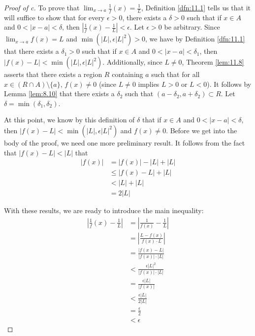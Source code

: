 \documentclass[../main.tex]{subfiles}
\begin{document}
\begin{theorem}
\begin{proof}[Proof of c]
        To prove that $\lim_{x\to a}\frac{1}{f}(x)=\frac{1}{L}$, Definition \ref{dfn:11.1} tells us that it will suffice  to show that for every $\epsilon>0$, there exists a $\delta>0$ such that if $x\in A$ and $0<|x-a|<\delta$, then $|\frac{1}{f}(x)-\frac{1}{L}|<\epsilon$. Let $\epsilon>0$ be arbitrary. Since $\lim_{x\to a}f(x)=L$ and $\min(|L|,\epsilon|L|^2)>0$, we have by Definition \ref{dfn:11.1} that there exists a $\delta_1>0$ such that if $x\in A$ and $0<|x-a|<\delta_1$, then $|f(x)-L|<\min(|L|,\epsilon|L|^2)$. Additionally, since $L\neq 0$, Theorem \ref{lem:11.8} asserts that there exists a region $R$ containing $a$ such that for all $x\in(R\cap A)\setminus\{a\}$, $f(x)\neq 0$ (since $L\neq 0$ implies $L>0$ or $L<0$). It follows by Lemma \ref{lem:8.10} that there exists a $\delta_2$ such that $(a-\delta_2,a+\delta_2)\subset R$. Let $\delta=\min(\delta_1,\delta_2)$.\par
        At this point, we know by this definition of $\delta$ that if $x\in A$ and $0<|x-a|<\delta$, then $|f(x)-L|<\min(|L|,\epsilon|L|^2)$ and $f(x)\neq 0$. Before we get into the body of the proof, we need one more preliminary result. It follows from the fact that $|f(x)-L|<|L|$ that
        \begin{align*}
            |f(x)| &= |f(x)|-|L|+|L|\\
            &\leq |f(x)-L|+|L|\\
            &< |L|+|L|\\
            &= 2|L|
        \end{align*}\par
        With these results, we are ready to introduce the main inequality:
        \begin{align*}
            \left| \frac{1}{f}(x)-\frac{1}{L} \right| &= \left| \frac{1}{f(x)}-\frac{1}{L} \right|\\
            &= \left| \frac{L-f(x)}{f(x)\cdot L} \right|\\
            &= \frac{|f(x)-L|}{|f(x)|\cdot|L|}\\
            &< \frac{\epsilon|L|^2}{|f(x)|\cdot|L|}\\
            &= \frac{\epsilon|L|}{|f(x)|}\\
            &< \frac{\epsilon|L|}{2|L|}\\
            &= \frac{\epsilon}{2}\\
            &< \epsilon
        \end{align*}
    \end{proof}
\end{theorem}
\end{document}
